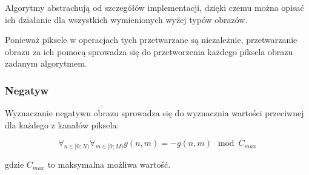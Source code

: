 \documentclass{classrep}
\begin{document}
Algorytmy abstrachują od szczegółów implementacji, dzięki czemu można opisać ich działanie dla wszystkich wymienionych wyżej typów obrazów.

Ponieważ piksele w operacjach tych przetwarzane są niezależnie, przetwarzanie obrazu za ich pomocą sprowadza się do przetworzenia każdego piksela obrazu zadanym algorytmem.

\subsubsection{Negatyw}
Wyznaczanie negatywu obrazu sprowadza się do wyznacznia wartości przeciwnej dla każdego z kanałów piksela:

\begin{equation}
 \mathop{\forall}_{n \in [0; N)} \mathop{\forall}_{m \in [0; M)} g(n, m) = -g(n, m) \mod C_{max}
\end{equation}

gdzie $C_{max}$ to maksymalna możliwa wartość.

\begin{thebibliography}{99}
\end{thebibliography}
\end{document}
